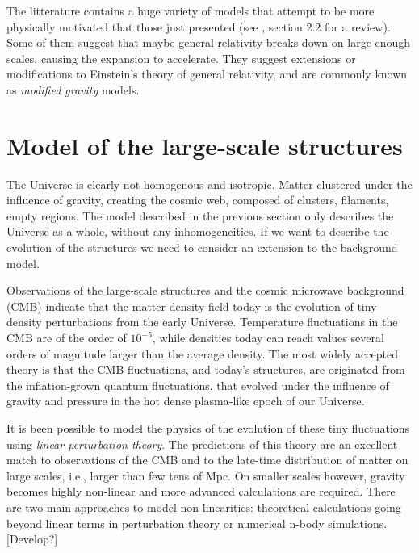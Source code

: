     The litterature contains a huge variety of models that attempt to be more physically motivated
    that those just presented (see \cite{weinbergObservationalProbesCosmic2013}, section 2.2 for a review). 
    Some of them suggest that maybe general relativity breaks down on large enough scales, 
    causing the expansion to accelerate. They suggest extensions or modifications to Einstein's 
    theory of general relativity, and are commonly known as \emph{modified gravity} models.   




\section{Model of the large-scale structures}
\label{intro:lss}

    The Universe is clearly not homogenous and isotropic. 
    Matter clustered under the influence of gravity, creating the cosmic web,
    composed of clusters, filaments, empty regions. 
    The model described in the previous section only describes the Universe
    as a whole, without any inhomogeneities. If we want to describe 
    the evolution of the structures we need to consider an extension to
    the background model. 

    Observations of the large-scale structures and  
    the cosmic microwave background (CMB)
    indicate that the matter density field today is the evolution of 
    tiny density perturbations from the early Universe. 
    Temperature fluctuations in the CMB are of the order of $10^{-5}$, 
    while densities today can reach values several orders of magnitude 
    larger than the average density.
    The most widely accepted theory is that the CMB fluctuations,
    and today's structures, are originated
    from the inflation-grown quantum fluctuations, that evolved under the 
    influence of gravity and pressure in the hot dense plasma-like epoch of our Universe. 
    
    It is been possible to model the physics of the evolution of these tiny 
    fluctuations using \emph{linear perturbation theory}. The predictions of this 
    theory are an excellent match to observations of the CMB and to the late-time
    distribution of matter on large scales, i.e., larger than few tens of Mpc. 
    On smaller scales however, gravity becomes highly non-linear and more advanced 
    calculations are required. There are two main approaches to model non-linearities:
    theoretical calculations going beyond linear terms in perturbation theory 
    or numerical n-body simulations. [Develop?]

